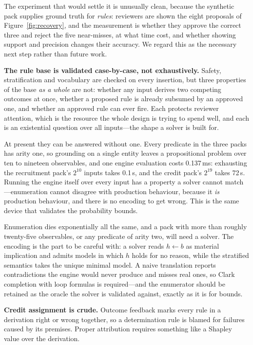 \documentclass[sigconf,nonacm]{acmart}
\begin{document}
The experiment that would settle it is unusually clean, because the synthetic
pack supplies ground truth for \emph{rules}: reviewers are shown the eight
proposals of Figure~\ref{fig:recovery}, and the measurement is whether they
approve the correct three and reject the five near-misses, at what time cost,
and whether showing support and precision changes their accuracy. We regard this
as the necessary next step rather than future work.

\textbf{The rule base is validated case-by-case, not exhaustively.} Safety,
stratification and vocabulary are checked on every insertion, but three
properties of the base \emph{as a whole} are not: whether any input derives two
competing outcomes at once, whether a proposed rule is already subsumed by an
approved one, and whether an approved rule can ever fire. Each protects
reviewer attention, which is the resource the whole design is trying to spend
well, and each is an existential question over all inputs---the shape a solver
is built for.

At present they can be answered without one. Every predicate in the three packs
has arity one, so grounding on a single entity leaves a propositional problem
over ten to nineteen observables, and one engine evaluation costs
0.137\,ms: exhausting the recruitment pack's $2^{10}$ inputs
takes 0.1\,s, and the credit pack's $2^{19}$ takes
72\,s. Running the engine itself over every input has a property a
solver cannot match---enumeration cannot disagree with production behaviour,
because it \emph{is} production behaviour, and there is no encoding to get
wrong. This is the same device that validates the probability bounds.

Enumeration dies exponentially all the same, and a pack with more than roughly
twenty-five observables, or any predicate of arity two, will need a solver. The
encoding is the part to be careful with: a solver reads $h \leftarrow b$ as
material implication and admits models in which $h$ holds for no reason, while
the stratified semantics takes the unique minimal model. A naive translation
reports contradictions the engine would never produce and misses real ones, so
Clark completion with loop formulas is required---and the enumerator should be
retained as the oracle the solver is validated against, exactly as it is for
bounds.

\textbf{Credit assignment is crude.} Outcome feedback marks every rule in a
derivation right or wrong together, so a determination rule is blamed for
failures caused by its premises. Proper attribution requires something like a
Shapley value over the derivation.
\end{document}
